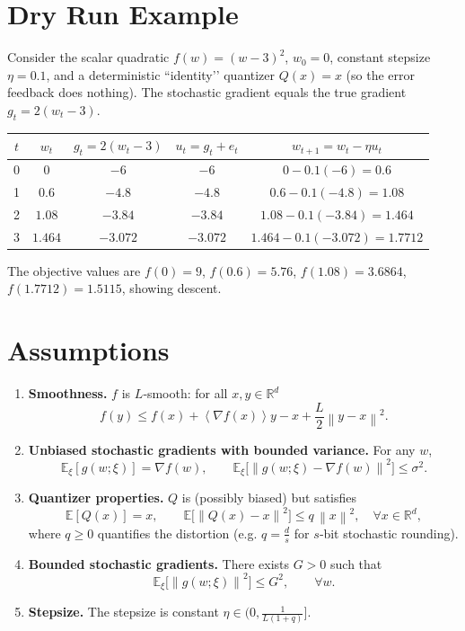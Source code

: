 \documentclass{article}
\newcommand{\E}{\mathbb{E}}
\newcommand{\R}{\mathbb{R}}
\newcommand{\norm}[1]{\left\|#1\right\|}
\newcommand{\inner}[1]{\left\langle #1 \right\rangle}
\begin{document}
\section*{Dry Run Example}
Consider the scalar quadratic $f(w)=(w-3)^{2}$, $w_{0}=0$, constant stepsize $\eta=0.1$, and a deterministic “identity’’ quantizer $Q(x)=x$ (so the error feedback does nothing). The stochastic gradient equals the true gradient $g_{t}=2(w_{t}-3)$.

\begin{center}
\begin{tabular}{c|c|c|c|c}
$t$ & $w_{t}$ & $g_{t}=2(w_{t}-3)$ & $u_{t}=g_{t}+e_{t}$ & $w_{t+1}=w_{t}-\eta u_{t}$\\ \hline
0 & $0$ & $-6$ & $-6$ & $0-0.1(-6)=0.6$\\
1 & $0.6$ & $-4.8$ & $-4.8$ & $0.6-0.1(-4.8)=1.08$\\
2 & $1.08$ & $-3.84$ & $-3.84$ & $1.08-0.1(-3.84)=1.464$\\
3 & $1.464$ & $-3.072$ & $-3.072$ & $1.464-0.1(-3.072)=1.7712$
\end{tabular}
\end{center}
The objective values are $f(0)=9$, $f(0.6)=5.76$, $f(1.08)=3.6864$, $f(1.7712)=1.5115$, showing descent.

\newpage
\section*{Assumptions}
\begin{enumerate}[label=\textbf{A\arabic*},leftmargin=*]
\item \textbf{Smoothness.} $f$ is $L$‑smooth: for all $x,y\in\R^{d}$
\[
f(y)\le f(x)+\inner{\nabla f(x)}{y-x}+\frac{L}{2}\norm{y-x}^{2}.
\tag{A1}
\]

\item \textbf{Unbiased stochastic gradients with bounded variance.} For any $w$,
\[
\E_{\xi}[g(w;\xi)] = \nabla f(w),\qquad
\E_{\xi}\bigl[\norm{g(w;\xi)-\nabla f(w)}^{2}\bigr]\le\sigma^{2}.
\tag{A2}
\]

\item \textbf{Quantizer properties.} $Q$ is (possibly biased) but satisfies
\[
\E[Q(x)]=x,\qquad
\E\bigl[\norm{Q(x)-x}^{2}\bigr]\le q\,\norm{x}^{2},\quad\forall x\in\R^{d},
\tag{A3}
\]
where $q\ge0$ quantifies the distortion (e.g. $q=\frac{d}{s}$ for $s$‑bit stochastic rounding).

\item \textbf{Bounded stochastic gradients.} There exists $G>0$ such that
\[
\E_{\xi}\bigl[\norm{g(w;\xi)}^{2}\bigr]\le G^{2},\qquad \forall w.
\tag{A4}
\]

\item \textbf{Stepsize.} The stepsize is constant $\eta\in(0,\tfrac{1}{L(1+q)}]$.
\end{enumerate}
\end{document}
